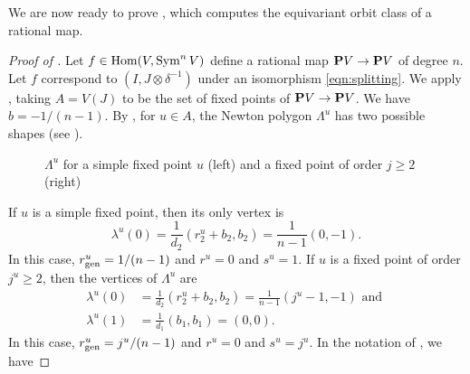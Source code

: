 \documentclass{amsart}
\begin{document}
We are now ready to prove , which computes the equivariant orbit class of a rational map.
\begin{proof}[Proof of ]
  Let \(f \in \Hom(V, \Sym^nV)\) define a rational map \(\P V \to \P V\) of degree \(n\).
  Let \(f\) correspond to \((I, J \otimes \delta^{-1})\) under an isomorphism \eqref{eqn:splitting}.
  We apply , taking \(A = V(J)\) to be the set of fixed points of \(\P V \to \P V\).
  We have \(b = -1/(n-1)\).
  By , for \(u \in A\), the Newton polygon \(\Lambda^u\) has two possible shapes (see ).
  \begin{figure}[ht]
    \centering
    \caption{\(\Lambda^u\) for a simple fixed point \(u\) (left) and a fixed point of order \(j \geq 2\) (right)}
    \label{fig:twoshapes}
  \end{figure}
  If \(u\) is a simple fixed point, then its only vertex is
  \[\lambda^u(0) = \frac{1}{d_2} (r_2^u+b_2,b_2) = \frac{1}{n-1}(0,-1).\]
  In this case, \(r_{\rm gen}^u = 1/(n-1)\) and \(r^u = 0\) and \(s^u = 1\).
  If \(u\) is a fixed point of order \(j^u \geq 2\), then the vertices of \(\Lambda^u\) are
  \[
    \begin{split}
      \lambda^u(0) &= \frac{1}{d_2}(r_2^u+b_2,b_2) = \frac{1}{n-1}{(j^u-1,-1)} \text{ and }\\
      \lambda^u(1) &= \frac{1}{d_1}(b_1,b_1) = (0,0).
    \end{split}
  \]
  In this case, \(r_{\rm gen}^u = j^u/(n-1)\) and \(r^u = 0\) and \(s^u = j^u\).
  In the notation of , we have

\end{proof}
\end{document}

